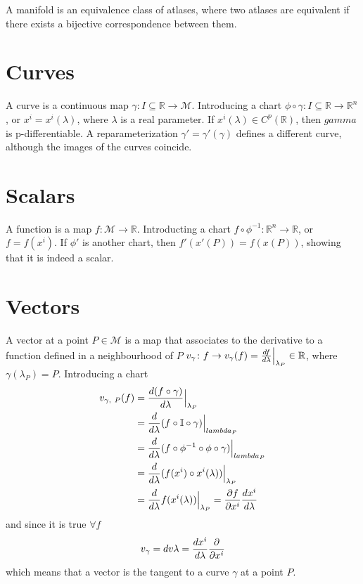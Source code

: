     A manifold is an equivalence class of atlases, where two atlases are equivalent if there exists a bijective correspondence between them.

\section{Curves}

    A curve is a continuous map $\gamma \colon I \subseteq \mathbb R \rightarrow \mathcal M$. Introducing a chart $\phi \circ \gamma \colon I \subseteq \mathbb R \rightarrow \mathbb R^n$, or $x^i = x^i(\lambda)$, where $\lambda$ is a real parameter. If $x^i(\lambda) \in C^p(\mathbb R)$, then $gamma$ is p-differentiable. A reparameterization $\gamma' = \gamma'(\gamma)$ defines a different curve, although the images of the curves coincide.

\section{Scalars}

    A function is a map $f \colon \mathcal M \rightarrow \mathbb R$. Introducting a chart $f \circ \phi^{-1} \colon \mathbb R^n \rightarrow \mathbb R$, or $f = f(x^i)$. If $\phi'$ is another chart, then $f'(x'(P)) = f(x(P))$, showing that it is indeed a scalar. 

\section{Vectors}

    A vector at a point $P \in \mathcal M$ is a map that associates to the derivative to a function defined in a neighbourhood of $P$ $v_{\gamma} \colon f \rightarrow v_\gamma(f) = \frac{df}{d\lambda}\Big\vert_{\lambda_P} \in \mathbb R$, where $\gamma(\lambda_P) = P$. Introducing a chart 
    \begin{equation*}
    \begin{aligned}
        v_{\gamma, ~P} (f) & = \frac{d(f \circ \gamma)}{d\lambda}\Big\vert_{\lambda_P} \\ & = \frac{d}{d\lambda} (f \circ \mathbb I \circ \gamma) \Big\vert_{lambda_P} \\ & = \frac{d}{d\lambda} (f \circ \phi^{-1} \circ \phi \circ \gamma) \Big\vert_{lambda_P} \\ & = \frac{d}{d\lambda} (f(x^i) \circ x^i(\lambda)) \Big\vert_{\lambda_P} \\ & = \frac{d}{d\lambda} f(x^i(\lambda)) \Big\vert_{\lambda_P} = \frac{\partial f}{\partial x^i} \frac{dx^i}{d\lambda}
    \end{aligned}
    \end{equation*}
    and since it is true $\forall f$
    \begin{equation}\label{vector}
        v_\gamma = dv{}{\lambda} = \frac{dx^i}{d\lambda} \frac{\partial}{\partial x^i}
    \end{equation}
    which means that a vector is the tangent to a curve $\gamma$ at a point $P$.

